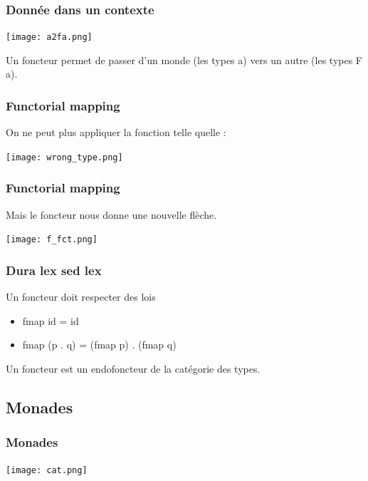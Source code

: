 \documentclass{beamer}
\begin{document}
\begin{frame}
\frametitle{Donnée dans un contexte}

\begin{center}
\texttt{[image: a2fa.png]}
\end{center}

\begin{block}{}
Un foncteur permet de passer d'un monde (les types a) vers un autre (les types F a).
\end{block}

\end{frame}

\begin{frame}
\frametitle{Functorial mapping}
On ne peut plus appliquer la fonction telle quelle :

\begin{center}
\texttt{[image: wrong\_type.png]}
\end{center}
\end{frame}

\begin{frame}
\frametitle{Functorial mapping}
Mais le foncteur nous donne une nouvelle flèche.
\begin{center}
\texttt{[image: f\_fct.png]}
\end{center}
\end{frame}



\begin{frame}
\frametitle{Dura lex sed lex}
\begin{alertblock}{Un foncteur doit respecter des lois}
\begin{itemize}
\item fmap id = id
\item fmap (p . q) = (fmap p) . (fmap q)

\end{itemize}
\end{alertblock}

\pause
Un foncteur est un endofoncteur de la catégorie des types.
\end{frame}

\subsection{Monades}

\begin{frame}

\frametitle{Monades}
\begin{center}
\texttt{[image: cat.png]}
\end{center}
\end{frame}
\end{document}
